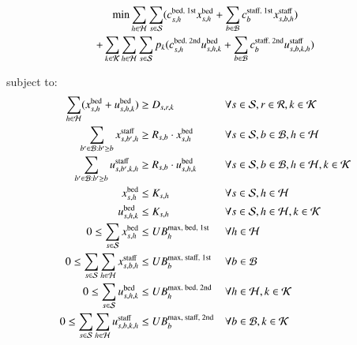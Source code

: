\documentclass[../thesis.tex]{subfiles}
\begin{document}
\begin{multline}\label{eq:sto_objective}
    \text{min} \sum_{h\in\mathcal{H}}\sum_{s\in\mathcal{S}}(c^\textnormal{bed, 1st}_{s,h}x^\textnormal{bed}_{s,h} + \sum_{b\in\mathcal{B}}c^\textnormal{staff, 1st}_{b}x^\textnormal{staff}_{s,b,h})\\ 
    +\sum_{k\in\mathcal{K}}\sum_{h\in\mathcal{H}}\sum_{s\in\mathcal{S}}p_{k}(c^\textnormal{bed, 2nd}_{s,h} u^\textnormal{bed}_{s,h,k}+
   \sum_{b\in\mathcal{B}} c^\textnormal{staff, 2nd}_{b}u^\textnormal{staff}_{s,b,k,h})
\end{multline}


subject to:
\begin{align}
    \sum_{h\in\mathcal{H}} ({x_{s,h}^\textnormal{bed}} +  {u_{s,h,k}^\textnormal{bed}}) &\geq D_{s,r,k}  & & \forall s \in \mathcal{S}, r \in \mathcal{R}, k \in \mathcal{K}  \label{eq:sto_con1}\\
    \sum\limits_{b'\in\mathcal{B}: b'\geq b} {x_{s,b',h}^\textnormal{staff}} &\geq R_{s,b}\cdot{x_{s,h}^\textnormal{bed}} & & \forall s \in \mathcal{S}, b \in \mathcal{B}, h \in \mathcal{H} \label{eq:sto_con2a}\\
    \sum\limits_{b'\in\mathcal{B}: b'\geq b} u_{s,b',k,h}^\textnormal{staff} &\geq R_{s,b} \cdot {u_{s,h,k}^\textnormal{bed}} & &\forall s \in \mathcal{S}, b \in \mathcal{B}, h \in \mathcal{H}, k \in \mathcal{K} \label{eq:sto_con2b}\\
    {x_{s,h}^\textnormal{bed}} &\leq K_{s,h} & & \forall s \in \mathcal{S}, h \in \mathcal{H}\label{eq:sto_con3a}\\
        {u_{s,h,k}^\textnormal{bed}} &\leq K_{s,h} & & \forall s \in \mathcal{S}, h \in \mathcal{H}, k \in \mathcal{K}\label{eq:sto_con3b}\\
       0 \leq \sum_{s\in\mathcal{S}}{x_{s,h}^\textnormal{bed}} &\leq {UB_h^\textnormal{max, bed, 1st}} & &\forall h \in \mathcal{H}\label{eq:sto_con4}\\
   0 \leq \sum_{s\in\mathcal{S}}\sum_{h\in\mathcal{H}}{x_{s,b,h}^\textnormal{staff}} &\leq {UB_{b}^\textnormal{max, staff, 1st}}& & \forall b \in \mathcal{B}\label{eq:sto_con5}\\
    0 \leq  \sum_{s\in\mathcal{S}}{u_{s,h,k}^\textnormal{bed}} &\leq {UB_h^\textnormal{max, bed, 2nd}} & & \forall h \in \mathcal{H}, k \in \mathcal{K}  \label{eq:sto_con6}\\
    0 \leq  \sum_{s\in\mathcal{S}}\sum_{h\in\mathcal{H}}{u_{s,b,k,h}^\textnormal{staff}} &\leq {UB_{b}^\textnormal{max, staff, 2nd}} & & \forall b \in \mathcal{B}, k \in \mathcal{K} \label{eq:sto_con7}
\end{align}
\end{document}
